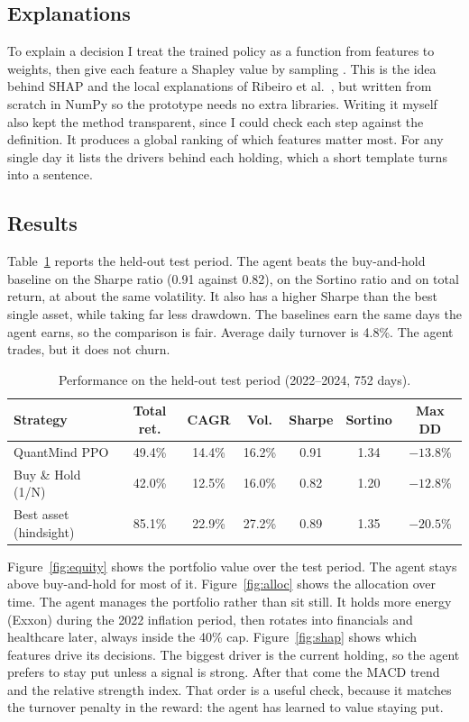 \documentclass[12pt,twoside,letterpaper]{article}
\begin{document}
\subsection{Explanations}

To explain a decision I treat the trained policy as a function from features to
weights, then give each feature a Shapley value by sampling \cite{strumbelj2014}.
This is the idea behind SHAP \cite{lundberg2017} and the local explanations of
Ribeiro et al.\ \cite{ribeiro2016}, but written from scratch in NumPy so the
prototype needs no extra libraries. Writing it myself also kept the method
transparent, since I could check each step against the definition. It produces a
global ranking of which features matter most. For any single day it lists the
drivers behind each holding, which a short template turns into a sentence.

\subsection{Results}

Table~\ref{tab:results} reports the held-out test period. The agent beats the
buy-and-hold baseline on the Sharpe ratio (0.91 against 0.82), on the Sortino ratio
and on total return, at about the same volatility. It also has a higher Sharpe than
the best single asset, while taking far less drawdown. The baselines earn the same
days the agent earns, so the comparison is fair. Average daily turnover is 4.8\%. The
agent trades, but it does not churn.

\begin{table}[H]
\centering
\caption{Performance on the held-out test period (2022--2024, 752 days).}
\label{tab:results}
\begin{tabular}{l c c c c c c}
\toprule
Strategy & Total ret. & CAGR & Vol. & Sharpe & Sortino & Max DD \\
\midrule
QuantMind PPO & 49.4\% & 14.4\% & 16.2\% & 0.91 & 1.34 & $-13.8\%$ \\
Buy \& Hold (1/N) & 42.0\% & 12.5\% & 16.0\% & 0.82 & 1.20 & $-12.8\%$ \\
Best asset (hindsight) & 85.1\% & 22.9\% & 27.2\% & 0.89 & 1.35 & $-20.5\%$ \\
\bottomrule
\end{tabular}
\end{table}

Figure~\ref{fig:equity} shows the portfolio value over the test period. The agent
stays above buy-and-hold for most of it. Figure~\ref{fig:alloc} shows the allocation
over time. The agent manages the portfolio rather than sit still. It holds more
energy (Exxon) during the 2022 inflation period, then rotates into financials and
healthcare later, always inside the 40\% cap. Figure~\ref{fig:shap} shows which
features drive its decisions. The biggest driver is the current holding, so the
agent prefers to stay put unless a signal is strong. After that come the MACD trend
and the relative strength index. That order is a useful check, because it matches the
turnover penalty in the reward: the agent has learned to value staying put.
\end{document}
